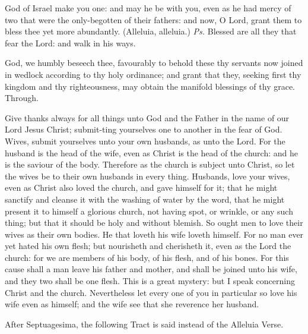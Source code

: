 \introit
{} God of Israel make you one: and may he be with you, even as he had mercy of two that were the only-begotten of their fathers: and now, O Lord, grant them to bless thee yet more abundantly. (Alleluia, alleluia.) \textit{Ps.} Blessed are all they that fear the Lord: and walk in his ways.

\collect
{} God, we humbly beseech thee, favourably to behold these thy servants now joined in wedlock according to thy holy ordinance; and grant that they, seeking first thy kingdom and thy righteousness, may obtain the manifold blessings of thy grace. Through.
 
 Give thanks always for all things unto God and the Father in the name of our Lord Jesus Christ; submit-ting yourselves one to another in the fear of God. Wives, submit yourselves unto your own husbands, as unto the Lord. For the husband is the head of the wife, even as Christ is the head of the church: and he is the saviour of the body. Therefore as the church is subject unto Christ, so let the wives be to their own husbands in every thing. Husbands, love your wives, even as Christ also loved the church, and gave himself for it; that he might sanctify and cleanse it with the washing of water by the word, that he might present it to himself a glorious church, not having spot, or wrinkle, or any such thing; but that it should be holy and without blemish. So ought men to love their wives as their own bodies. He that loveth his wife loveth himself. For no man ever yet hated his own flesh; but nourisheth and cherisheth it, even as the Lord the church: for we are members of his body, of his flesh, and of his bones. For this cause shall a man leave his father and mother, and shall be joined unto his wife, and they two shall be one flesh. This is a great mystery: but I speak concerning Christ and the church. Nevertheless let every one of you in particular so love his wife even as himself; and the wife see that she reverence her husband.


\begin{rubric}
    After Septuagesima, the following Tract is said instead of the Alleluia Verse.
\end{rubric}

